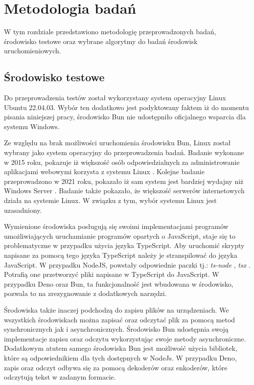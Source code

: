 \section{Metodologia badań}\label{sec:methodology}
W tym rozdziale przedstawiono metodologię przeprowadzonych badań, środowisko testowe oraz wybrane algorytmy do badań środowisk uruchomieniowych.

\subsection{Środowisko testowe}
Do przeprowadzenia testów został wykorzystany system operacyjny Linux Ubuntu 22.04.03. Wybór ten dodatkowo jest podyktowany faktem iż do momentu pisania niniejszej pracy, środowisko Bun nie udostępniło oficjalnego wsparcia dla systemu Windows.

Ze względu na brak możliwości uruchomienia środowisku Bun, Linux został wybrany jako system operacyjny do przeprowadzenia badań. Badanie wykonane w 2015 roku, pokazuje iż większość osób odpowiedzialnych za administrowanie aplikacjami webowymi korzysta z systemu Linux \cite{performance_comparison_linux}. Kolejne badanie przeprowadzono w 2021 roku, pokazało iż sam system jest bardziej wydajny niż Windows Server \cite{web_server_performance}. Badanie także pokazało, że większość serwerów internetowych działa na systemie Linux. W związku z tym, wybór systemu Linux jest uzasadniony.

Wymienione środowiska posługują się swoimi implementacjami programów umożliwiających uruchamianie programów opartych o JavaScript, staje się to problematyczne w przypadku użycia języka TypeScript. Aby uruchomić skrypty napisane za pomocą tego języka TypeScript należy je stranspilować do języka JavaScript. W przypadku NodeJS, powstały odpowiednie paczki tj.: \textit{ts-node} \cite{ts_node}, \textit{tsx} \cite{tsx}. Potrafią one przetworzyć pliki napisane w TypeScript do JavaScript. W przypadku Deno oraz Bun, ta funkcjonalność jest wbudowana w środowisko, pozwala to na zrezygnowanie z dodatkowych narzędzi.

Środowiska także inaczej podchodzą do zapisu plików na urządzeniach. We wszystkich środowiskach można zapisać oraz odczytać plik za pomocą metod synchronicznych jak i asynchronicznych. Środowisko Bun udostępnia swoją implementacje zapisu oraz odczytu wykorzystując swoje metody asynchroniczne. Dodatkowym atutem samego środowiska Bun jest możliwość użycia bibliotek, które są odpowiednikiem dla tych dostępnych w NodeJs. W przypadku Deno, zapis oraz odczyt odbywa się za pomocą dekoderów oraz enkoderów, które odczytują tekst w zadanym formacie.

